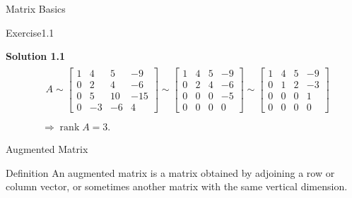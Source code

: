 \documentclass{beamer}
\begin{document}
\begin{section}{Matrix Basics}
\begin{frame}{Exercise1.1}
        \pause 
        \par \textbf{Solution 1.1}
        \begin{equation*}
            \begin{aligned}
                & \begin{gathered}
                    A \sim\left[\begin{array}{cccc}
                    1 & 4 & 5 & -9 \\
                    0 & 2 & 4 & -6 \\
                    0 & 5 & 10 &-15\\
                    0 & -3 &-6 &4
                    \end{array}\right] \sim\left[\begin{array}{cccc}
                     1 & 4 & 5 & -9 \\
                    0 & 2 & 4 & -6 \\
                    0 & 0 & 0 & -5\\
                    0 & 0 & 0 & 0
                    \end{array}\right] \sim\left[\begin{array}{cccc}
                    1 & 4 & 5 & -9 \\
                    0 & 1 & 2 & -3 \\
                    0 & 0 & 0 & 1\\
                    0 & 0 & 0 & 0
                    \end{array}\right] \\
                \end{gathered} \\
            &\Rightarrow \operatorname{rank} A=3.
            \end{aligned}
        \end{equation*}
\end{frame}

\begin{frame}[label=10]{Augmented Matrix}
    \begin{block}{Definition}
        An augmented matrix is a matrix obtained by adjoining a row or column vector, or sometimes another matrix with the same vertical dimension.
    \end{block}


\end{frame}
\end{section}
\end{document}
